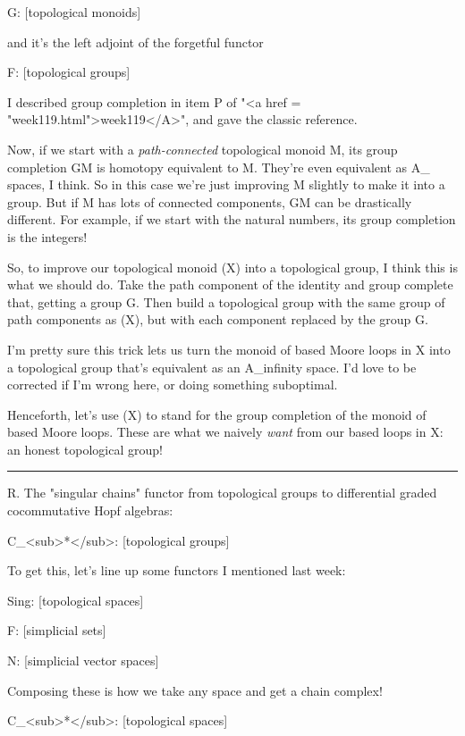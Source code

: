G: [topological monoids] 

and it's the left adjoint of the forgetful functor

F: [topological groups] 

I described group completion in item P of "<a href =
"week119.html">week119</A>", and gave the classic reference.

Now, if we start with a \emph{path-connected} topological monoid M, its
group completion GM is homotopy equivalent to M.  They're even
equivalent as A_{\infty } spaces, I think.  So in this case we're just
improving M slightly to make it into a group.  But if M has lots of
connected components, GM can be drastically different.  For example,
if we start with the natural numbers, its group completion is the
integers!  

So, to improve our topological monoid \Omega (X) into a topological
group, I think this is what we should do.  Take the path component of
the identity and group complete that, getting a group G.  Then build a
topological group with the same group of path components as \Omega (X),
but with each component replaced by the group G.  

I'm pretty sure this trick lets us turn the monoid of based Moore
loops in X into a topological group that's equivalent as an
A_{i}nfinity space.  I'd love to be corrected if I'm wrong
here, or doing something suboptimal.

Henceforth, let's use \Omega (X) to stand for the group completion of
the monoid of based Moore loops.  These are what we naively \emph{want}
from our based loops in X: an honest topological group!

\par\noindent\rule{\textwidth}{0.4pt}
R.  The "singular chains" functor from topological groups to
differential graded cocommutative Hopf algebras:

C_{<sub>*}</sub>: [topological groups] \to  [DGCHAs]

To get this, let's line up some functors I mentioned last week:

Sing: [topological spaces] 

F: [simplicial sets] 

N: [simplicial vector spaces] 

Composing these is how we take any space and get a chain complex!

C_{<sub>*}</sub>: [topological spaces] 

